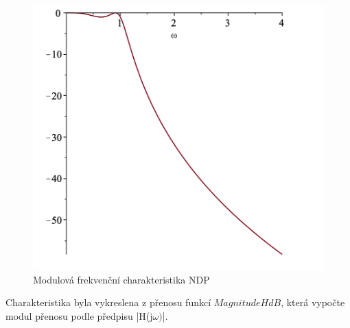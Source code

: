 \begin{figure}[h]
\centering
\includegraphics[scale=0.5]{sch02.png}
\caption{Modulová frekvenční charakteristika NDP}
\end{figure}
\noindent Charakteristika byla vykreslena z přenosu funkcí $MagnitudeHdB$, která vypočte modul přenosu podle předpisu |H(j$\omega)$|.
